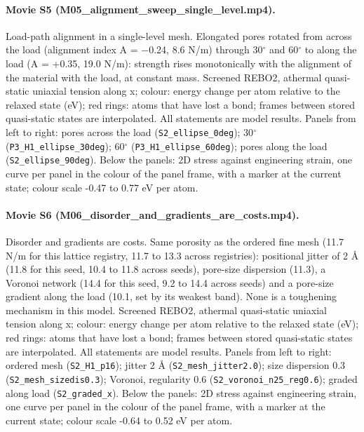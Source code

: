 \paragraph{Movie S5 (M05\_alignment\_sweep\_single\_level.mp4).} Load-path alignment in a single-level mesh. Elongated pores rotated from across the load (alignment index A = $-$0.24, 8.6 N/m) through 30$^\circ$ and 60$^\circ$ to along the load (A = +0.35, 19.0 N/m): strength rises monotonically with the alignment of the material with the load, at constant mass. Screened REBO2, athermal quasi-static uniaxial tension along x; colour: energy change per atom relative to the relaxed state (eV); red rings: atoms that have lost a bond; frames between stored quasi-static states are interpolated. All statements are model results. Panels from left to right: pores across the load (\texttt{S2\_ellipse\_0deg}); 30$^\circ$ (\texttt{P3\_H1\_ellipse\_30deg}); 60$^\circ$ (\texttt{P3\_H1\_ellipse\_60deg}); pores along the load (\texttt{S2\_ellipse\_90deg}). Below the panels: 2D stress against engineering strain, one curve per panel in the colour of the panel frame, with a marker at the current state; colour scale -0.47 to 0.77 eV per atom.

\paragraph{Movie S6 (M06\_disorder\_and\_gradients\_are\_costs.mp4).} Disorder and gradients are costs. Same porosity as the ordered fine mesh (11.7 N/m for this lattice registry, 11.7 to 13.3 across registries): positional jitter of 2 \AA{} (11.8 for this seed, 10.4 to 11.8 across seeds), pore-size dispersion (11.3), a Voronoi network (14.4 for this seed, 9.2 to 14.4 across seeds) and a pore-size gradient along the load (10.1, set by its weakest band). None is a toughening mechanism in this model. Screened REBO2, athermal quasi-static uniaxial tension along x; colour: energy change per atom relative to the relaxed state (eV); red rings: atoms that have lost a bond; frames between stored quasi-static states are interpolated. All statements are model results. Panels from left to right: ordered mesh (\texttt{S2\_H1\_p16}); jitter 2 \AA{} (\texttt{S2\_mesh\_jitter2.0}); size dispersion 0.3 (\texttt{S2\_mesh\_sizedis0.3}); Voronoi, regularity 0.6 (\texttt{S2\_voronoi\_n25\_reg0.6}); graded along load (\texttt{S2\_graded\_x}). Below the panels: 2D stress against engineering strain, one curve per panel in the colour of the panel frame, with a marker at the current state; colour scale -0.64 to 0.52 eV per atom.

